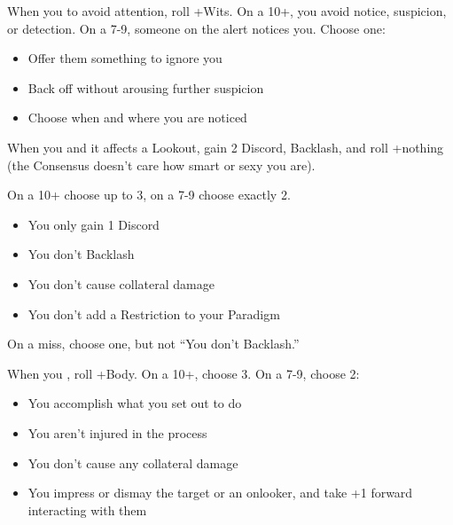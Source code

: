 \begin{multicols}{3}
  \SEPARATOR

  \begin{move}
    When you  to avoid attention, roll
    +Wits. On a 10+, you avoid notice, suspicion, or detection. On a
    7-9, someone on the alert notices you. Choose one:
    \begin{itemize}
      \setlength\itemsep{0em}
    \item Offer them something to ignore you
    \item Back off without arousing further suspicion
    \item Choose when and where you are noticed
    \end{itemize}
  \end{move}

  \SEPARATOR

  \begin{move}
    When you  and it affects a Lookout, gain
    2 Discord, Backlash, and roll +nothing (the Consensus doesn't care
    how smart or sexy you are).

    On a 10+ choose up to 3, on a 7-9 choose exactly 2.
    \begin{itemize}
      \setlength\itemsep{0em}
    \item You only gain 1 Discord
    \item You don't Backlash
    \item You don't cause collateral damage
    \item You don't add a Restriction to your Paradigm
    \end{itemize}
    On a miss, choose one, but not ``You don't Backlash.''
  \end{move}

  \columnbreak
  
  \begin{move}
    When you , roll +Body. On a 10+, choose 3. On a 7-9,
    choose 2:
    \begin{itemize}
      \setlength\itemsep{0em}
    \item You accomplish what you set out to do
    \item You aren't injured in the process
    \item You don't cause any collateral damage
    \item You impress or dismay the target or an onlooker, and take +1
      forward interacting with them
    \end{itemize}
  \end{move}


\end{multicols}
